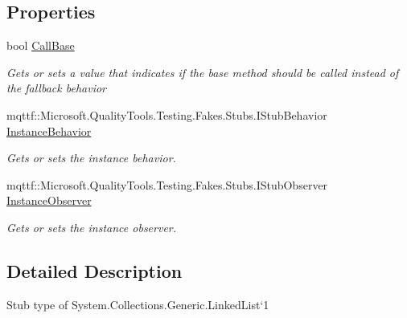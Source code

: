 \subsection*{Properties}
\begin{DoxyCompactItemize}
\item 
bool \hyperlink{class_system_1_1_collections_1_1_generic_1_1_fakes_1_1_stub_linked_list_3_01_t_01_4_aac89ac349cf32b4eaef30fc668e60271}{Call\-Base}
\begin{DoxyCompactList}\small\item\em Gets or sets a value that indicates if the base method should be called instead of the fallback behavior\end{DoxyCompactList}\item 
mqttf\-::\-Microsoft.\-Quality\-Tools.\-Testing.\-Fakes.\-Stubs.\-I\-Stub\-Behavior \hyperlink{class_system_1_1_collections_1_1_generic_1_1_fakes_1_1_stub_linked_list_3_01_t_01_4_a7326712fa30d8b298dd6933adf2bfd77}{Instance\-Behavior}
\begin{DoxyCompactList}\small\item\em Gets or sets the instance behavior.\end{DoxyCompactList}\item 
mqttf\-::\-Microsoft.\-Quality\-Tools.\-Testing.\-Fakes.\-Stubs.\-I\-Stub\-Observer \hyperlink{class_system_1_1_collections_1_1_generic_1_1_fakes_1_1_stub_linked_list_3_01_t_01_4_a48f42bde28b7851ce99a9b3744339e83}{Instance\-Observer}
\begin{DoxyCompactList}\small\item\em Gets or sets the instance observer.\end{DoxyCompactList}\end{DoxyCompactItemize}


\subsection{Detailed Description}
Stub type of System.\-Collections.\-Generic.\-Linked\-List`1




